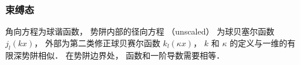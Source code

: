 
\subsubsection{束缚态}

角向方程为球谐函数， 势阱内部的径向方程 （unscaled） 为球贝塞尔函数 ${j_l}(kx)$，  外部为第二类修正球贝赛尔函数 ${k_l}(\kappa x)$，   $k$ 和 $\kappa $ 的定义与一维的有限深势阱相似． 在势阱边界处， 函数和一阶导数需要相等． 
